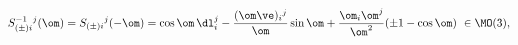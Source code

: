 \begin{equation}                                        \label{elsogi}
  S^{-1}_{(\pm)i}{}^j(\om)=S_{(\pm)i}{}^j(-\om)=\cos\om\,\dl_i^j
  -\frac{(\om\ve)_i{}^j}\om\sin\om
  +\frac{\om_i\om^j}{\om^2}(\pm1-\cos\om)~\in\MO(3),
\end{equation}

